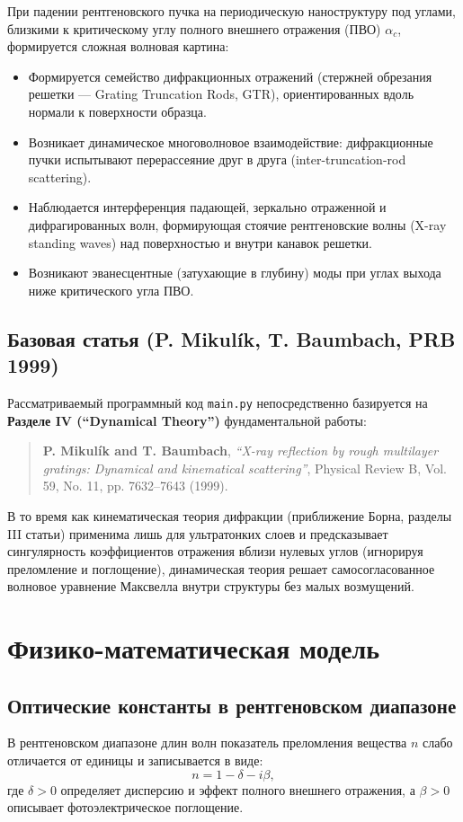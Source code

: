 \documentclass[a4paper,11pt]{article}
\begin{document}
При падении рентгеновского пучка на периодическую наноструктуру под углами, близкими к критическому углу полного внешнего отражения (ПВО) $\alpha_c$, формируется сложная волновая картина:
\begin{itemize}
    \item Формируется семейство дифракционных отражений (стержней обрезания решетки --- Grating Truncation Rods, GTR), ориентированных вдоль нормали к поверхности образца.
    \item Возникает динамическое многоволновое взаимодействие: дифракционные пучки испытывают перерассеяние друг в друга (inter-truncation-rod scattering).
    \item Наблюдается интерференция падающей, зеркально отраженной и дифрагированных волн, формирующая стоячие рентгеновские волны (X-ray standing waves) над поверхностью и внутри канавок решетки.
    \item Возникают эванесцентные (затухающие в глубину) моды при углах выхода ниже критического угла ПВО.
\end{itemize}

\subsection{Базовая статья (P. Mikulík, T. Baumbach, PRB 1999)}
Рассматриваемый программный код \texttt{main.py} непосредственно базируется на \textbf{Разделе IV (``Dynamical Theory'')} фундаментальной работы:
\begin{quote}
\textbf{P. Mikulík and T. Baumbach}, \emph{``X-ray reflection by rough multilayer gratings: Dynamical and kinematical scattering''}, Physical Review B, Vol. 59, No. 11, pp. 7632--7643 (1999).
\end{quote}

В то время как кинематическая теория дифракции (приближение Борна, разделы III статьи) применима лишь для ультратонких слоев и предсказывает сингулярность коэффициентов отражения вблизи нулевых углов (игнорируя преломление и поглощение), динамическая теория решает самосогласованное волновое уравнение Максвелла внутри структуры без малых возмущений.

\section{Физико-математическая модель}

\subsection{Оптические константы в рентгеновском диапазоне}
В рентгеновском диапазоне длин волн показатель преломления вещества $n$ слабо отличается от единицы и записывается в виде:
\begin{equation}
n = 1 - \delta - i\beta,
\end{equation}
где $\delta > 0$ определяет дисперсию и эффект полного внешнего отражения, а $\beta > 0$ описывает фотоэлектрическое поглощение. 
\end{document}
